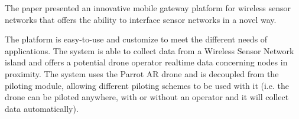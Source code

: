 The paper presented an innovative mobile gateway platform for wireless sensor networks
that offers the ability to interface sensor networks in a novel way.



The platform is easy-to-use and customize to meet the different needs of applications. The system is able to collect data from a Wireless Sensor Network island and offers a potential drone operator realtime data concerning nodes in proximity. The system uses the Parrot AR drone and is decoupled from the piloting module, allowing different piloting schemes to be used with it (i.e. the drone can be piloted anywhere, with or without an operator and it will collect data automatically).


